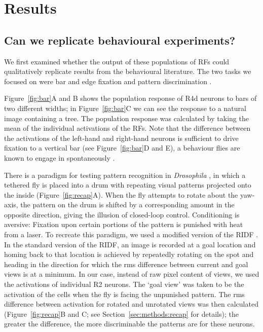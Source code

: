\section{Results}

\subsection{Can we replicate behavioural experiments?}
We first examined whether the output of these populations of \acp{RF} could qualitatively replicate results from the behavioural literature.
The two tasks we focused on were bar and edge fixation \cite{Neuser2008,Osorio1990} and pattern discrimination \cite{Liu2006,Ernst1999}.

Figure~\ref{fig:bar}A and B shows the population response of R4d neurons to bars of two different widths; in Figure~\ref{fig:bar}C we can see the response to a natural image containing a tree.
The population response was calculated by taking the mean of the individual activations of the \acp{RF}.
Note that the difference between the activations of the left-hand and right-hand neurons is sufficient to drive fixation to a vertical bar (see Figure~\ref{fig:bar}D and E), a behaviour flies are known to engage in spontaneously \cite{Reichardt1969}.

There is a paradigm for testing pattern recognition in \emph{Drosophila} \cite{Pan2009,Liu2006,Ernst1999}, in which a tethered fly is placed into a drum with repeating visual patterns projected onto the inside (Figure~\ref{fig:recap}A).
When the fly attempts to rotate about the yaw-axis, the pattern on the drum is shifted by a corresponding amount in the opposite direction, giving the illusion of closed-loop control.
Conditioning is aversive: Fixation upon certain portions of the pattern is punished with heat from a laser.
To recreate this paradigm, we used a modified version of the \ac{RIDF} \cite{Philippides2011,Zeil2003}.
In the standard version of the \ac{RIDF}, an image is recorded at a goal location and homing back to that location is achieved by repeatedly rotating on the spot and heading in the direction for which the \ac{rms} difference between current and goal views is at a minimum.
In our case, instead of raw pixel content of views, we used the activations of individual R2 neurons.
The `goal view' was taken to be the activation of the cells when the fly is facing the unpunished pattern.
The \ac{rms} difference between activation for rotated and unrotated views was then calculated (Figure~\ref{fig:recap}B and C; see Section~\ref{sec:methods:recap} for details); the greater the difference, the more discriminable the patterns are for these neurons.

